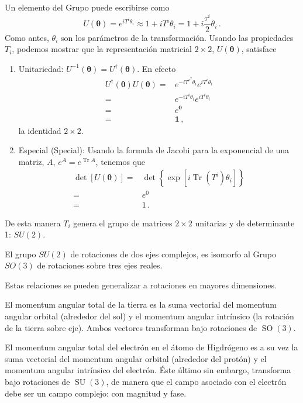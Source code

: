 Un elemento del Grupo puede escribirse como
\begin{equation}
  \label{eq:63qft}
  U(\boldsymbol{\theta})=e^{iT^i \theta_i }\approx1+iT^i\theta_i=1+i\frac{\tau^i}{2}\theta_i\,.
\end{equation}
Como antes, $\theta_i$ son los parámetros de la transformación.  Usando las propiedades $T_i$, podemos mostrar que la representación matricial $2\times 2$, $U(\boldsymbol{\theta})$, satisface
\begin{enumerate}
\item Unitariedad: $U^{-1}(\boldsymbol{\theta})=U^{\dagger}(\boldsymbol{\theta})$. En efecto
  \begin{align*}
    U^{\dagger}(\boldsymbol{\theta})U(\boldsymbol{\theta})=&e^{-i{T^i}^{\dagger} \theta_i }e^{iT^i \theta_i }\nonumber\\
=&e^{-i T^i \theta_i }e^{iT^i \theta_i } \nonumber\\
=&e^{\mathbf{0}}\nonumber\\
=&\mathbf{1}\,,
  \end{align*}
la identidad $2\times 2$.
\item Especial (Special): Usando la formula de Jacobi para la exponencial de una matriz, $A$, $e^{A}=e^{\operatorname{Tr}A}$, tenemos que
  \begin{align*}
   \det[U(\boldsymbol{\theta})]=&\det\left\{\exp\left[  i \operatorname{Tr}\left( T^i \right)\theta_i \right]  \right\}\nonumber\\
                           =&e^{0}\nonumber\\
                           =&1\,.
  \end{align*}
\end{enumerate}
De esta manera $T_i$ genera el grupo de matrices $2\times 2$ unitarias y de determinante 1: $SU(2)$. 

El grupo $SU(2)$ de rotaciones de dos ejes complejos, es isomorfo al Grupo $SO(3)$ de rotaciones sobre tres ejes reales.

Estas relaciones se pueden generalizar a rotaciones en mayores dimensiones.

El momentum angular total de la tierra es la suma vectorial del momentum angular orbital (alrededor del sol) y el momentum angular intrínsico (la rotación de la tierra sobre eje). Ambos vectores transforman bajo rotaciones de $\operatorname{SO}(3)$.

El momentum angular total del electrón en el átomo de Higdrógeno es a su vez la suma vectorial del momentum angular orbital (alrededor del protón) y el momentum angular intrínsico del electrón.  Éste último sin embargo, transforma bajo rotaciones de $\operatorname{SU}(3)$, de manera que el campo asociado con el electrón debe ser un campo complejo: con magnitud y fase.


